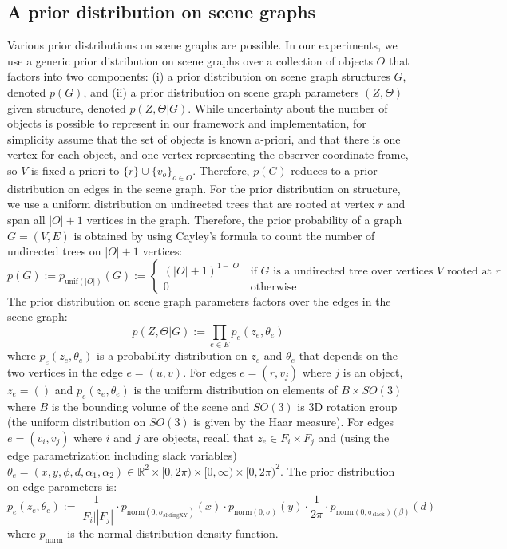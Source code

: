 \subsection{A prior distribution on scene graphs} \label{section:prior}
Various prior distributions on scene graphs are possible.
In our experiments, we use a generic prior distribution on scene graphs over a collection of objects $O$ that factors into two components:
(i) a prior distribution on scene graph structures $G$, denoted $p(G)$, and
(ii) a prior distribution on scene graph parameters $(Z, \Theta)$ given structure, denoted $p(Z, \Theta | G)$.
While uncertainty about the number of objects is possible to represent in our framework and implementation, for simplicity assume that the set of objects is known a-priori, and that there is one vertex for each object, and one vertex representing the observer coordinate frame, so $V$ is fixed a-priori to $\{r\} \cup \{v_o\}_{o \in O}$.
Therefore, $p(G)$ reduces to a prior distribution on edges in the scene graph.
For the prior distribution on structure, we use a uniform distribution on undirected trees that are rooted at vertex $r$ and span all $|O| + 1$ vertices in the graph.
Therefore, the prior probability of a graph $G = (V, E)$ is obtained by using Cayley's formula to count the number of undirected trees on $|O| +1$ vertices:
\begin{equation}
    p(G) := p_{\mathrm{unif}(|O|)}(G) := \left\{
    \begin{array}{ll}
    (|O| + 1)^{1 - |O|} & \mbox{if $G$ is a undirected tree over vertices $V$ rooted at $r$}\\
    0 & \mbox{otherwise}
    \end{array}
    \right.
\end{equation}
The prior distribution on scene graph parameters factors over the edges in the scene graph:
\begin{equation}
    p(Z, \Theta | G) := \prod_{e \in E} p_e(z_e, \theta_e)
\end{equation}
where $p_e(z_e, \theta_e)$ is a probability distribution on $z_e$ and $\theta_e$ that depends on the two vertices in the edge $e = (u, v)$.
For edges $e = (r, v_j)$ where $j$ is an object, $z_e = ()$ and $p_e(z_e, \theta_e)$ is the uniform distribution on elements of $B \times SO(3)$ where $B$ is the bounding volume of the scene and $SO(3)$ is 3D rotation group (the uniform distribution on $SO(3)$ is given by the Haar measure).
For edges $e = (v_i, v_j)$ where $i$ and $j$ are objects, recall that $z_e \in F_i \times F_j$ and (using the edge parametrization including slack variables) $\theta_e = (x, y, \phi, d, \alpha_1, \alpha_2) \in \mathbb{R}^2 \times [0, 2 \pi) \times [0, \infty) \times [0, 2 \pi)^2$.
The prior distribution on edge parameters is:
\begin{equation}
    p_e(z_e, \theta_e) := \frac{1}{|F_i| |F_j|}
    \cdot p_{\mathrm{norm}(0, \sigma_\mathrm{sliding XY})}(x) \cdot p_{\mathrm{norm}(0, \sigma)}(y)
    \cdot \frac{1}{2 \pi}
    \cdot p_{\mathrm{norm(0, \sigma_\mathrm{slack})}(\beta)}(d)
\end{equation}
where $p_{\mathrm{norm}}$ is the normal distribution density function.

